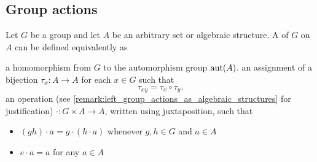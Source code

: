 \subsection{Group actions}\label{subsec:group_actions}

\begin{definition}\label{def:left_group_action}\cite[159]{Knapp2016BAlg}
  Let \( G \) be a group and let \( A \) be an arbitrary set or algebraic structure. A  of \( G \) on \( A \) can be defined equivalently as
  \begin{defenum}
     a homomorphism from \( G \) to the automorphism group \( \operatorname{aut}(A) \).
     an assignment of a bijection \( \tau_x: A \to A \) for each \( x \in G \) such that
    \begin{equation*}
      \tau_{xy} = \tau_x \circ \tau_y.
    \end{equation*}
     an operation (see \cref{remark:left_group_actions_as_algebraic_structures} for justification) \( \cdot: G \times A \to A \), written using juxtaposition, such that
    \begin{itemize}
      \item \( (g h) \cdot a = g \cdot (h \cdot a) \) whenever \( g, h \in G \) and \( a \in A \)
      \item \( e \cdot a = a \) for any \( a \in A \)
    \end{itemize}
  \end{defenum}
\end{definition}

